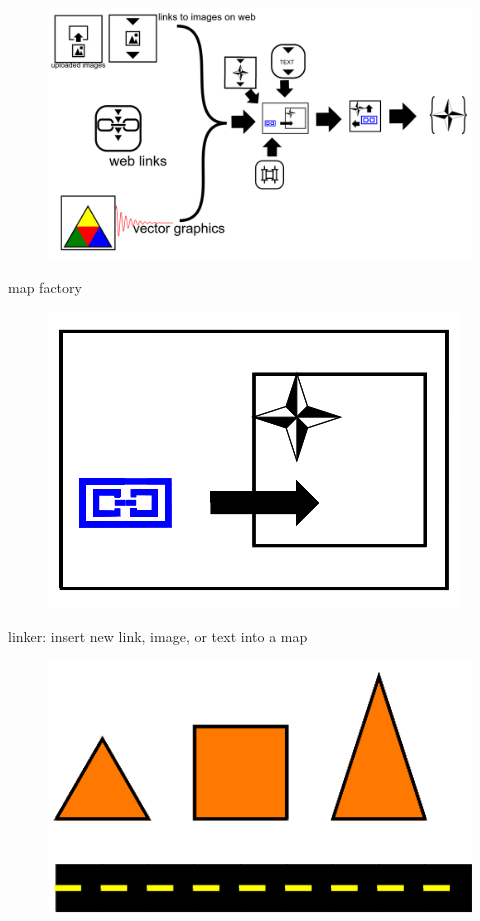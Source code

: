 \documentclass[11pt]{article}
\begin{document}
\begin{figure}
\includegraphics[scale=0.3]{image8.png}
\end{figure}
map factory
\begin{figure}
\includegraphics[scale=0.3]{image9.png}
\end{figure}
linker: insert new link, image, or text into a map
\begin{figure}
\includegraphics[scale=0.3]{image10.png}
\end{figure}
\end{document}
